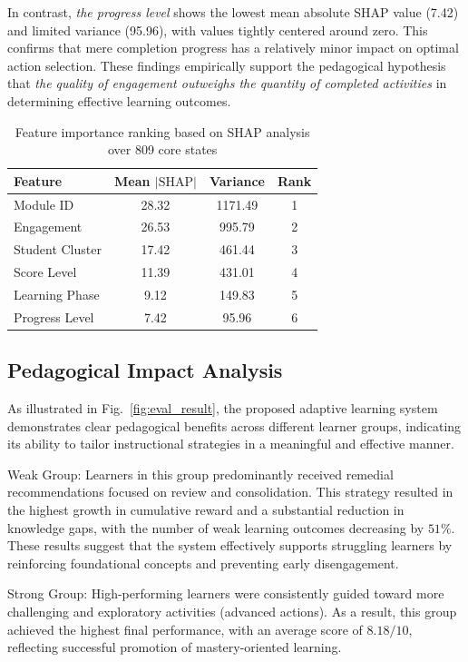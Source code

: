 \documentclass[conference]{IEEEtran}
\begin{document}
In contrast, \textit{the progress level} shows the lowest mean absolute SHAP value (7.42) and limited variance (95.96), with values tightly centered around zero. This confirms that mere completion progress has a relatively minor impact on optimal action selection. These findings empirically support the pedagogical hypothesis that \emph{the quality of engagement outweighs the quantity of completed activities} in determining effective learning outcomes.

\begin{table}[t]
\caption{Feature importance ranking based on SHAP analysis over 809 core states}
\label{tab:shap_importance}
\begin{center}
\small
\begin{tabular}{lccc}
\toprule
\textbf{Feature} & \textbf{Mean $|\text{SHAP}|$} & \textbf{Variance} & \textbf{Rank} \\
\midrule
Module ID & 28.32 & 1171.49 & 1 \\
Engagement & 26.53 & 995.79 & 2 \\
Student Cluster & 17.42 & 461.44 & 3 \\
Score Level & 11.39 & 431.01 & 4 \\
Learning Phase & 9.12 & 149.83 & 5 \\
Progress Level & 7.42 & 95.96 & 6 \\
\bottomrule
\end{tabular}
\end{center}
\end{table}

\subsection{Pedagogical Impact Analysis}
As illustrated in Fig.~\ref{fig:eval_result}, the proposed adaptive learning system demonstrates clear pedagogical benefits across different learner groups, indicating its ability to tailor instructional strategies in a meaningful and effective manner.

Weak Group: Learners in this group predominantly received remedial recommendations focused on review and consolidation. This strategy resulted in the highest growth in cumulative reward and a substantial reduction in knowledge gaps, with the number of weak learning outcomes decreasing by $51\%$. These results suggest that the system effectively supports struggling learners by reinforcing foundational concepts and preventing early disengagement.

Strong Group: High-performing learners were consistently guided toward more challenging and exploratory activities (advanced actions). As a result, this group achieved the highest final performance, with an average score of $8.18/10$, reflecting successful promotion of mastery-oriented learning.
\end{document}
